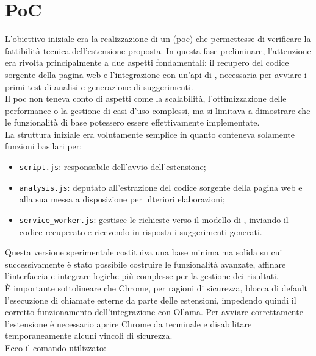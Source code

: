 \section{PoC}
\noindent L’obiettivo iniziale era la realizzazione di un  (\acrshort{poc}) che permettesse di verificare la fattibilità tecnica dell’estensione proposta. In questa fase preliminare, l’attenzione era rivolta principalmente a due aspetti fondamentali: il recupero del codice sorgente della pagina web e l’integrazione con un’\acrshort{api} di , necessaria per avviare i primi test di analisi e generazione di suggerimenti.\\
Il \acrshort{poc} non teneva conto di aspetti come la scalabilità, l’ottimizzazione delle performance o la gestione di casi d’uso complessi, ma si limitava a dimostrare che le funzionalità di base potessero essere effettivamente implementate. 
\\La struttura iniziale era volutamente semplice in quanto conteneva solamente funzioni basilari per:
\begin{itemize}
  \item \texttt{script.js}: responsabile dell’avvio dell’estensione;
  \item \texttt{analysis.js}: deputato all’estrazione del codice sorgente della pagina web e alla sua messa a disposizione per ulteriori elaborazioni;
  \item \texttt{service\_worker.js}: gestisce le richieste verso il modello di , inviando il codice recuperato e ricevendo in risposta i suggerimenti generati.
\end{itemize}

\noindent Questa versione sperimentale costituiva una base minima ma solida su cui successivamente è stato possibile costruire le funzionalità avanzate, affinare l’interfaccia e integrare logiche più complesse per la gestione dei risultati.\\

\noindent \label{subsec:NB}È importante sottolineare che Chrome, per ragioni di sicurezza, blocca di default l’esecuzione di chiamate esterne da parte delle estensioni, impedendo quindi il corretto funzionamento dell’integrazione con Ollama. Per avviare correttamente l’estensione è necessario aprire Chrome da terminale e disabilitare temporaneamente alcuni vincoli di sicurezza. \\
Ecco il comando utilizzato:

